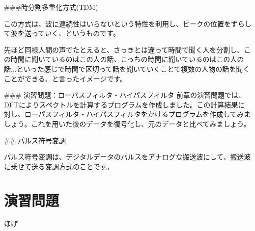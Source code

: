 ###時分割多重化方式(TDM)

この方式は、波に連続性はいらないという特性を利用し、ピークの位置をずらして波を送っていく、というものです。

先ほど同様人間の声でたとえると、さっきとは違って時間で聞く人を分割し、この時間に聞いているのはこの人の話、こっちの時間に聞いているのはこの人の話...といった感じで時間で区切って話を聞いていくことで複数の人物の話を聞くことができる、と言ったイメージです。

### 演習問題：ローパスフィルタ・ハイパスフィルタ
前章の演習問題では、DFTによりスペクトルを計算するプログラムを作成しました。この計算結果に対し、ローパスフィルタ・ハイパスフィルタをかけるプログラムを作成してみましょう。これを用いた後のデータを復号化し、元のデータと比べてみましょう。

## パルス符号変調

パルス符号変調は、デジタルデータのパルスをアナログな搬送波にして、搬送波に乗せて送る変調方式のことです。


\section{}

\section*{演習問題}
\begin{problems}
\item ほげ
\end{problems}
